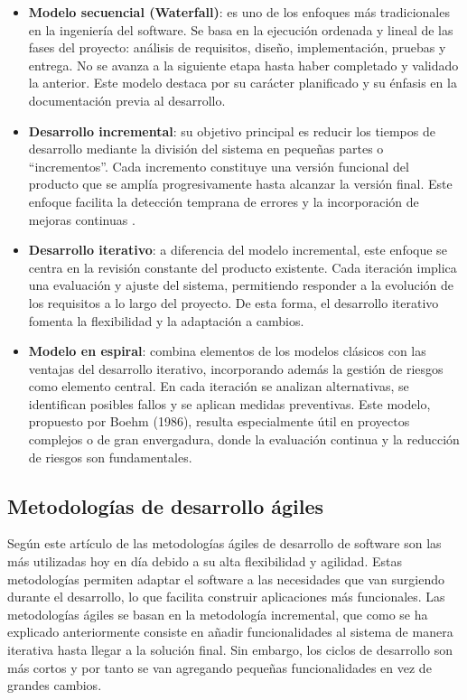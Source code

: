 \begin{itemize}
 \item \textbf{Modelo secuencial (Waterfall)}: es uno de los enfoques más tradicionales en la ingeniería del software. Se basa en la ejecución ordenada y lineal de las fases del proyecto: análisis de requisitos, diseño, implementación, pruebas y entrega. No se avanza a la siguiente etapa hasta haber completado y validado la anterior. Este modelo destaca por su carácter planificado y su énfasis en la documentación previa al desarrollo.

 \item \textbf{Desarrollo incremental}: su objetivo principal es reducir los tiempos de desarrollo mediante la división del sistema en pequeñas partes o “incrementos”. Cada incremento constituye una versión funcional del producto que se amplía progresivamente hasta alcanzar la versión final. Este enfoque facilita la detección temprana de errores y la incorporación de mejoras continuas \parencite{EvolucionMetodologiasDesarrollo}.

 \item \textbf{Desarrollo iterativo}: a diferencia del modelo incremental, este enfoque se centra en la revisión constante del producto existente. Cada iteración implica una evaluación y ajuste del sistema, permitiendo responder a la evolución de los requisitos a lo largo del proyecto. De esta forma, el desarrollo iterativo fomenta la flexibilidad y la adaptación a cambios.

 \item \textbf{Modelo en espiral}: combina elementos de los modelos clásicos con las ventajas del desarrollo iterativo, incorporando además la gestión de riesgos como elemento central. En cada iteración se analizan alternativas, se identifican posibles fallos y se aplican medidas preventivas. Este modelo, propuesto por Boehm (1986), resulta especialmente útil en proyectos complejos o de gran envergadura, donde la evaluación continua y la reducción de riesgos son fundamentales.
\end{itemize}


\subsection{Metodologías de desarrollo ágiles}
Según este artículo de \textcite{metodologiasDesarrolloDeSoftware} las metodologías ágiles de desarrollo de software son las más utilizadas hoy en día debido a su alta flexibilidad y agilidad. Estas metodologías permiten adaptar el software a las necesidades que van surgiendo durante el desarrollo, lo que facilita construir aplicaciones más funcionales. Las metodologías ágiles se basan en la metodología incremental, que como se ha explicado anteriormente consiste en añadir funcionalidades al sistema de manera iterativa hasta llegar a la solución final. Sin embargo, los ciclos de desarrollo son más cortos y por tanto se van agregando pequeñas funcionalidades en vez de grandes cambios.

